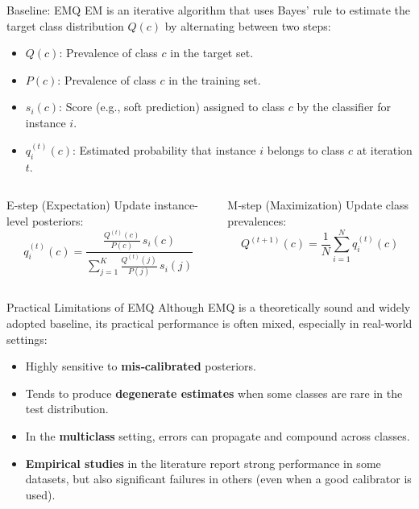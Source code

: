 \documentclass[aspectratio=169]{beamer}
\begin{document}
\begin{frame}{Baseline: EMQ}
  EM is an iterative algorithm that uses Bayes’ rule to estimate the target class distribution $Q(c)$ by alternating between two steps:
  
  \begin{itemize}
    \item $Q(c)$: Prevalence of class $c$ in the target set.
    \item $P(c)$: Prevalence of class $c$ in the training set.
    \item $s_i(c)$: Score (e.g., soft prediction) assigned to class $c$ by the classifier for instance $i$.
    \item $q_i^{(t)}(c)$: Estimated probability that instance $i$ belongs to class $c$ at iteration $t$.
  \end{itemize}

  \begin{columns}
    \begin{column}{0.4\textwidth}
      \begin{block}{E‑step (Expectation)}
        \small
        Update instance-level posteriors:
        $$q_i^{(t)}(c)=\frac{\frac{Q^{(t)}(c)}{P(c)}\,s_i(c)}{\sum_{j=1}^{K}\frac{Q^{(t)}(j)}{P(j)}\,s_i(j)}$$
      \end{block}
    \end{column}
    \begin{column}{0.4\textwidth}
      \begin{block}{M‑step (Maximization)}
        \small
        Update class prevalences:
        $$Q^{(t+1)}(c)=\frac{1}{N}\sum_{i=1}^{N}q_i^{(t)}(c)$$
      \end{block}
    \end{column}
  \end{columns}
\end{frame}


\begin{frame}{Practical Limitations of EMQ}
  Although EMQ is a theoretically sound and widely adopted baseline, its practical performance is often mixed, especially in real-world settings:

  \begin{itemize}
    \item Highly sensitive to \textbf{mis‑calibrated} posteriors.
    \item Tends to produce \textbf{degenerate estimates} when some classes are rare in the test distribution.
    \item In the \textbf{multiclass} setting, errors can propagate and compound across classes.
    \item \textbf{Empirical studies} in the literature report strong performance in some datasets, but also significant failures in others (even when a good calibrator is used).
  \end{itemize}
\end{frame}
\end{document}
